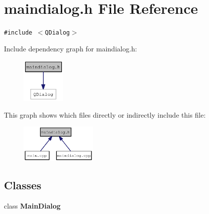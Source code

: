 \section{maindialog.h File Reference}
\label{maindialog_8h}
{\tt \#include $<$QDialog$>$}\par


Include dependency graph for maindialog.h:\nopagebreak
\begin{figure}[H]
\begin{center}
\leavevmode
\includegraphics[width=60pt]{maindialog_8h__incl}
\end{center}
\end{figure}


This graph shows which files directly or indirectly include this file:\nopagebreak
\begin{figure}[H]
\begin{center}
\leavevmode
\includegraphics[width=105pt]{maindialog_8h__dep__incl}
\end{center}
\end{figure}
\subsection*{Classes}
\begin{CompactItemize}
\item 
class {\bf MainDialog}
\end{CompactItemize}
